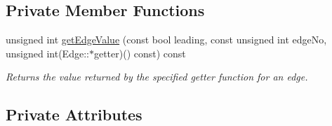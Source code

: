 \subsection*{Private Member Functions}
\begin{DoxyCompactItemize}
\item 
unsigned int \hyperlink{class_packet_af3abe7485b62e417e83b11c8891ba7a6}{get\+Edge\+Value} (const bool leading, const unsigned int edge\+No, unsigned int(Edge\+::$\ast$getter)() const) const
\begin{DoxyCompactList}\small\item\em Returns the value returned by the specified getter function for an edge. \end{DoxyCompactList}\end{DoxyCompactItemize}
\subsection*{Private Attributes}
